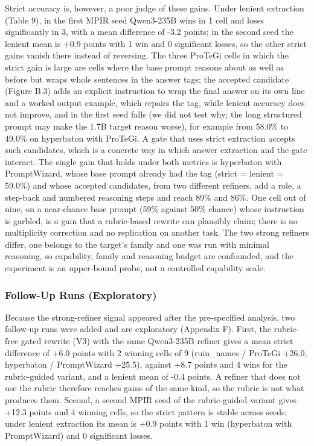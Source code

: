\documentclass{ieeeaccess}
\begin{document}
Strict accuracy is, however, a poor judge of these gains. Under lenient extraction (Table 9), in the first MPIR seed Qwen3-235B wins in 1 cell and loses significantly in 3, with a mean difference of -3.2 points; in the second seed the lenient mean is +0.9 points with 1 win and 0 significant losses, so the other strict gains vanish there instead of reversing. The three ProTeGi cells in which the strict gain is large are cells where the base prompt reasons about as well as before but wraps whole sentences in the answer tags; the accepted candidate (Figure B.3) adds an explicit instruction to wrap the final answer on its own line and a worked output example, which repairs the tag, while lenient accuracy does not improve, and in the first seed falls (we did not test why; the long structured prompt may make the 1.7B target reason worse), for example from 58.0\% to 49.0\% on hyperbaton with ProTeGi. A gate that uses strict extraction accepts such candidates, which is a concrete way in which answer extraction and the gate interact. The single gain that holds under both metrics is hyperbaton with PromptWizard, whose base prompt already had the tag (strict = lenient = 59.0\%) and whose accepted candidates, from two different refiners, add a role, a step-back and numbered reasoning steps and reach 89\% and 86\%. One cell out of nine, on a near-chance base prompt (59\% against 50\% chance) whose instruction is garbled, is a gain that a rubric-based rewrite can plausibly claim; there is no multiplicity correction and no replication on another task. The two strong refiners differ, one belongs to the target's family and one was run with minimal reasoning, so capability, family and reasoning budget are confounded, and the experiment is an upper-bound probe, not a controlled capability scale.

\subsubsection{Follow-Up Runs (Exploratory)}

Because the strong-refiner signal appeared after the pre-specified analysis, two follow-up runs were added and are exploratory (Appendix F). First, the rubric-free gated rewrite (V3) with the same Qwen3-235B refiner gives a mean strict difference of +6.0 points with 2 winning cells of 9 (ruin\_\allowbreak{}names / ProTeGi +26.0, hyperbaton / PromptWizard +25.5), against +8.7 points and 4 wins for the rubric-guided variant, and a lenient mean of -0.4 points. A refiner that does not use the rubric therefore reaches gains of the same kind, so the rubric is not what produces them. Second, a second MPIR seed of the rubric-guided variant gives +12.3 points and 4 winning cells, so the strict pattern is stable across seeds; under lenient extraction its mean is +0.9 points with 1 win (hyperbaton with PromptWizard) and 0 significant losses.
\end{document}

